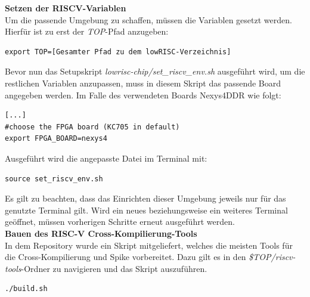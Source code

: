 \vspace{5mm}
\textbf{Setzen der RISCV-Variablen}\\

Um die passende Umgebung zu schaffen, müssen die Variablen gesetzt werden. Hierfür ist zu erst der \emph{TOP}-Pfad anzugeben:\\

\begin{lstlisting}[caption={Setzen der TOP-Variable},label={code:topvariable}]
export TOP=[Gesamter Pfad zu dem lowRISC-Verzeichnis]
\end{lstlisting}



Bevor nun das Setupskript \emph{lowrisc-chip/set\_riscv\_env.sh} ausgeführt wird, um die restlichen Variablen anzupassen, muss in diesem Skript das passende Board angegeben werden.
Im Falle des verwendeten Boards Nexys4DDR wie folgt:\\

\begin{lstlisting}[caption={Anpassung des Zielsystems},label={code:zielsystem}]
[...]
#choose the FPGA board (KC705 in default)
export FPGA_BOARD=nexys4
\end{lstlisting}


Ausgeführt wird die angepasste Datei im Terminal mit:\\

\begin{lstlisting}[caption={Umgebungsvariablen},label={code:umgebungsvariablen}]
source set_riscv_env.sh
\end{lstlisting}

Es gilt zu beachten, dass das Einrichten dieser Umgebung jeweils nur für das genutzte Terminal gilt. Wird ein neues beziehungsweise ein weiteres Terminal geöffnet, müssen vorherigen Schritte erneut ausgeführt werden.\\

\textbf{Bauen des RISC-V Cross-Kompilierung-Tools}\\

In dem Repository wurde ein Skript mitgeliefert, welches die meisten Tools für die Cross-Kompilierung und Spike vorbereitet.
Dazu gilt es in den \emph{\$TOP/riscv-tools}-Ordner zu navigieren und das Skript
auszuführen.\\

\begin{lstlisting}[caption={Ausführen des \emph{build}-Skripts},label={code:buildskript}]
./build.sh
\end{lstlisting}



